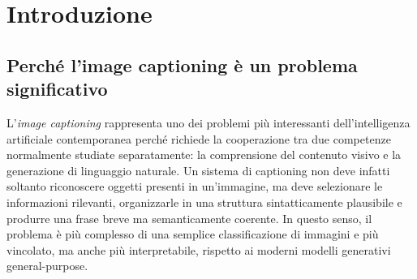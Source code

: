 \documentclass[11pt,a4paper]{report}
\newcommand{\dataset}{\texttt{Flickr8k}}
\begin{document}
\begin{abstract}
Il progetto affronta il task di \emph{image captioning}, ovvero la generazione automatica di una descrizione testuale a partire dal contenuto visivo di un'immagine. Il lavoro è stato sviluppato sul dataset pubblico \dataset{}, scelto per la sua diffusione come benchmark di piccola scala nei problemi di visione-linguaggio, ed è stato implementato in PyTorch mediante una pipeline \emph{image-to-sequence} costituita da un encoder convoluzionale pre-addestrato e da un decoder LSTM. Rispetto a una semplice relazione descrittiva, il presente documento assume una prospettiva più rigorosa: le scelte architetturali sono motivate rispetto al vincolo del dataset, il protocollo sperimentale è ricostruito a partire dai file di configurazione e dai log reali, e i risultati quantitativi vengono letti criticamente alla luce delle diverse varianti addestrate.

La campagna sperimentale ha incluso una baseline e tre ablation controllate: rimozione dello scheduled sampling, rimozione del label smoothing e attivazione del fine-tuning della CNN. I risultati, valutati tramite punteggi BLEU e analisi qualitativa delle caption, mostrano che la configurazione migliore è quella con fine-tuning della componente convoluzionale, che raggiunge un BLEU-4 pari a 0.0649. Al contrario, la rimozione dello scheduled sampling e del label smoothing determina un peggioramento coerente su tutte le metriche principali. La relazione discute inoltre i limiti del modello, le discrepanze tra loss e qualità linguistica e le implicazioni metodologiche derivanti dall'addestramento in ambiente CPU-only.
\end{abstract}

\chapter{Introduzione}

\section{Perché l'image captioning è un problema significativo}

L'\emph{image captioning} rappresenta uno dei problemi più interessanti dell'intelligenza artificiale contemporanea perché richiede la cooperazione tra due competenze normalmente studiate separatamente: la comprensione del contenuto visivo e la generazione di linguaggio naturale. Un sistema di captioning non deve infatti soltanto riconoscere oggetti presenti in un'immagine, ma deve selezionare le informazioni rilevanti, organizzarle in una struttura sintatticamente plausibile e produrre una frase breve ma semanticamente coerente. In questo senso, il problema è più complesso di una semplice classificazione di immagini e più vincolato, ma anche più interpretabile, rispetto ai moderni modelli generativi general-purpose.
\end{document}

